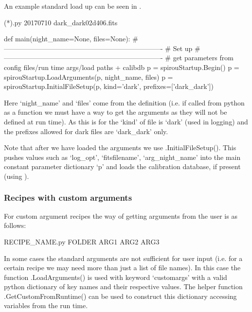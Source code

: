 An example standard load up can be seen in \calDARK.

\begin{cmdbox}
(*\calDARK*).py 20170710 dark_dark02d406.fits
\end{cmdbox}

\begin{pythonbox}
def main(night_name=None, files=None):
    # ----------------------------------------------------------------------
    # Set up
    # ----------------------------------------------------------------------
    # get parameters from config files/run time args/load paths + calibdb
    p = spirouStartup.Begin()
    p = spirouStartup.LoadArguments(p, night_name, files)
    p = spirouStartup.InitialFileSetup(p, kind='dark', prefixes=['dark_dark'])
\end{pythonbox}
\begin{note}
Here `night\_name' and `files' come from the \progMAIN definition (i.e. if called from python as a function we must have a way to get the arguments as they will not be defined at run time). As this is for \calDARK the `kind' of file is `dark' (used in logging) and the prefixes allowed for dark files are `dark\_dark' only.
\end{note}

Note that after we have loaded the arguments we use \spirouStartup.InitialFileSetup(). This pushes values such as `log\_opt', `fitsfilename', `arg\_night\_name' into the main constant parameter dictionary `p' and loads the calibration database, if present (using \spirouStartup{}).

\subsubsection{Recipes with custom arguments}
\label{ch:the_recipes:gen_layout:custom_arguments}

For custom argument recipes the way of getting arguments from the user is as follows:

\begin{cmdbox}
RECIPE_NAME.py FOLDER ARG1 ARG2 ARG3
\end{cmdbox}

In some cases the standard arguments are not sufficient for user input (i.e. for a certain recipe we may need more than just a list of file names). In this case the function \spirouStartup.LoadArguments() is used with keyword `customargs' with a valid python dictionary of key names and their respective values. The helper function \spirouStartup.GetCustomFromRuntime() can be used to construct this dictionary accessing variables from the run time. 

